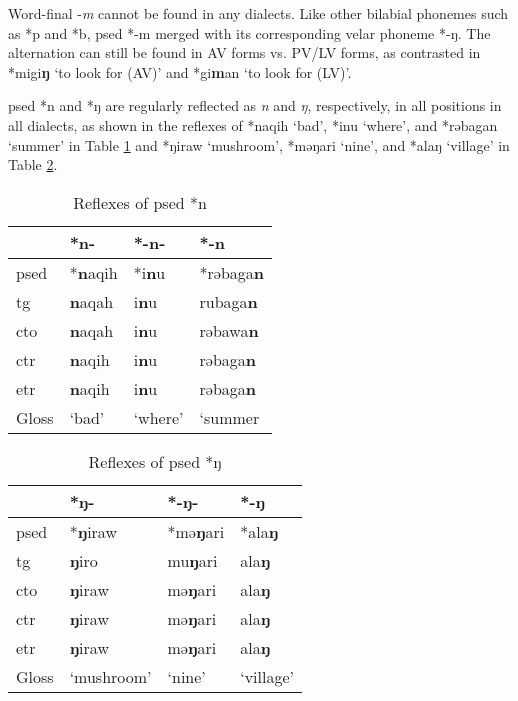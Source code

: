 Word-final -\textit{m} cannot be found in any dialects. Like other bilabial phonemes such as *p and *b, \acl{psed} *-m merged with its corresponding velar phoneme *-ŋ. The alternation can still be found in AV forms vs. PV/LV forms, as contrasted in *migi\textbf{ŋ} `to look for (AV)' and *gi\textbf{m}an `to look for (LV)'. 

\acl{psed} *n and *ŋ are regularly reflected as \textit{n} and \textit{ŋ}, respectively, in all positions in all dialects, as shown in the reflexes of *naqih `bad', *inu `where', and *rəbagan `summer' in Table \ref{tab:psed_n} and *ŋiraw `mushroom', *məŋari `nine', and *alaŋ `village' in Table \ref{tab:psed_ŋ}.

\begin{table}[!htbp]
\centering
\caption{Reflexes of \acl{psed} *n}
\label{tab:psed_n}
\begin{tabular}{llll}
\hline
           & *n-    & *-n-    & *-n     \\ \hline
\acs{psed} & *\textbf{n}aqih & *i\textbf{n}u    & *rəbaga\textbf{n} \\ \hdashline
\acs{tg}   & \textbf{n}aqah  & i\textbf{n}u     & rubaga\textbf{n} \\
\acs{cto}  & \textbf{n}aqah  & i\textbf{n}u     & rəbawa\textbf{n} \\
\acs{ctr}  & \textbf{n}aqih  & i\textbf{n}u     & rəbaga\textbf{n} \\
\acs{etr}  & \textbf{n}aqih  & i\textbf{n}u     & rəbaga\textbf{n} \\ \hline
Gloss      & `bad'  & `where' & `summer \\ \hline
\end{tabular}
\end{table}

\begin{table}[!htbp]
\centering
\caption{Reflexes of \acl{psed} *ŋ}
\label{tab:psed_ŋ}
\begin{tabular}{llll}
\hline
           & *ŋ-        & *-ŋ-    & *-ŋ       \\ \hline
\acs{psed} & *\textbf{ŋ}iraw     & *mə\textbf{ŋ}ari & *ala\textbf{ŋ}     \\ \hdashline
\acs{tg}   & \textbf{ŋ}iro       & mu\textbf{ŋ}ari  & ala\textbf{ŋ}      \\
\acs{cto}  & \textbf{ŋ}iraw      & mə\textbf{ŋ}ari  & ala\textbf{ŋ}      \\
\acs{ctr}  & \textbf{ŋ}iraw      & mə\textbf{ŋ}ari  & ala\textbf{ŋ}      \\
\acs{etr}  & \textbf{ŋ}iraw      & mə\textbf{ŋ}ari  & ala\textbf{ŋ}      \\ \hline
Gloss      & `mushroom' & `nine'  & `village' \\ \hline
\end{tabular}
\end{table}

